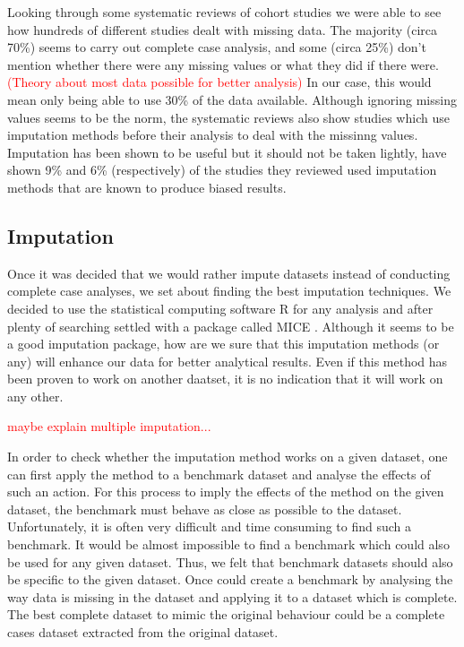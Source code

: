 \documentclass{IEEEconf}
\begin{document}
		Looking through some systematic reviews of cohort studies \cite{systematic1,systematic2,systematic3} we were able to see how hundreds of different studies dealt with missing data. The majority (circa 70\%) seems to carry out complete case analysis, and some (circa 25\%) don't mention whether there were any missing values or what they did if there were. \textcolor{red}{(Theory about most data possible for better analysis)} In our case, this would mean only being able to use 30\% of the data available. Although ignoring missing values seems to be the norm, the systematic reviews also show studies which use imputation methods before their analysis to deal with the missinng values. Imputation has been shown to be useful\cite{impact} but it should not be taken lightly, \cite{systematic1,systematic2} have shown 9\% and 6\% (respectively) of the studies they reviewed used imputation methods that are known to produce biased results.

		\subsection{Imputation} %
		\label{sub:imputation}
		
		Once it was decided that we would rather impute datasets instead of conducting complete case analyses, we set about finding the best imputation techniques. We decided to use the statistical computing software R \cite{r} for any analysis and after plenty of searching settled with a package called MICE \cite{mice}. Although it seems to be a good imputation package, how are we sure that this imputation methods (or any) will enhance our data for better analytical results. Even if this method has been proven to work on another daatset, it is no indication that it will work on any other. 

		\textcolor{red}{maybe explain multiple imputation...}

		In order to check whether the imputation method works on a given dataset, one can first apply the method to a benchmark dataset and analyse the effects of such an action. For this process to imply the effects of the method on the given dataset, the benchmark must behave as close as possible to the dataset. Unfortunately, it is often very difficult and time consuming to find such a benchmark. It would be almost impossible to find a benchmark which could also be used for any given dataset. Thus, we felt that benchmark datasets should also be specific to the given dataset. Once could create a benchmark by analysing the way data is missing in the dataset and applying it to a dataset which is complete. The best complete dataset to mimic the original behaviour could be a complete cases dataset extracted from the original dataset. 
\end{document}
